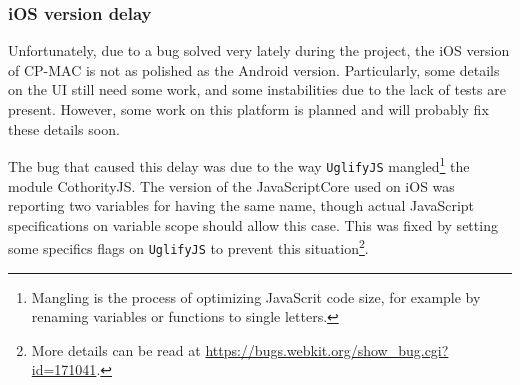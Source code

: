 \subsubsection*{iOS version delay}
Unfortunately, due to a bug solved very lately during the project, the iOS version of CP-MAC is not as polished as the Android version. Particularly, some details on the UI still need some work, and some instabilities due to the lack of tests are present. However, some work on this platform is planned and will probably fix these details soon. 

The bug that caused this delay was due to the way \texttt{UglifyJS} mangled\footnote{Mangling is the process of optimizing JavaScrit code size, for example by renaming variables or functions to single letters.} the module CothorityJS. The version of the JavaScriptCore used on iOS was reporting two variables for having the same name, though actual JavaScript specifications on variable scope should allow this case. This was fixed by setting some specifics flags on \texttt{UglifyJS} to prevent this situation\footnote{More details can be read at \url{https://bugs.webkit.org/show_bug.cgi?id=171041}.}.

